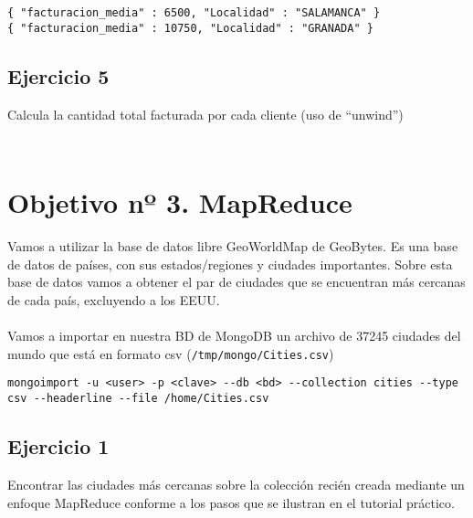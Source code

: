 \begin{lstlisting}
{ "facturacion_media" : 6500, "Localidad" : "SALAMANCA" }
{ "facturacion_media" : 10750, "Localidad" : "GRANADA" }
\end{lstlisting}

\subsection{Ejercicio 5}

Calcula la cantidad total facturada por cada cliente (uso de ``unwind'')

\begin{lstlisting}

\end{lstlisting}

\begin{lstlisting}

\end{lstlisting}

\section{Objetivo nº 3. MapReduce}

Vamos a utilizar la base de datos libre GeoWorldMap de GeoBytes. Es una base de datos de países, con sus estados/regiones y ciudades importantes. Sobre esta base de datos vamos a obtener el par de ciudades que se encuentran más cercanas de cada país, excluyendo a los EEUU.
\\ \\
Vamos a importar en nuestra BD de MongoDB un archivo de 37245 ciudades del mundo que está en formato csv (\texttt{/tmp/mongo/Cities.csv})

\begin{lstlisting}
mongoimport -u <user> -p <clave> --db <bd> --collection cities --type csv --headerline --file /home/Cities.csv
\end{lstlisting}

\subsection{Ejercicio 1}

Encontrar las ciudades más cercanas sobre la colección recién creada mediante un enfoque MapReduce conforme a los pasos que se ilustran en el tutorial práctico.

\begin{lstlisting}

\end{lstlisting}

